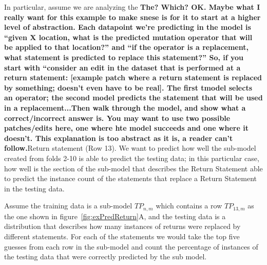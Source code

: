 \documentclass[conference]{IEEEtran}
\newcommand{\todo}[1]
  {{\scriptsize \textbf{\color{red} {#1}}}}
\begin{document}
In 
particular, assume we are analyzing the\todo{The? Which?  OK.  Maybe what I
  really want for this example to make snese is for it to start at a higher
  level of abstraction.  Each datapoint we're predicting in the model is ``given
  X location, what is the predicted mutation operator that will be applied to
  that location?''  and ``if the operator is a replacement, what statement is
  predicted to replace this statement?''  So, if you start with ``consider an
  edit in the dataset that is performed at a return statement: [example patch
  where a return statement is replaced by something; doesn't even have to be
  real].  The first tmodel selects an operator; the second model predicts the
  statement that will be used in a replacement...Then walk through the model,
  and show what a correct/incorrect answer is.  You may want to use two possible
  patches/edits here, one where hte model succeeds and one where it doesn't.
  This explanation is too abstract as it is, a reader can't follow.}Return statement (Row 13). We want to 
predict 
how well the sub-model created from folds 2-10 is able to predict the testing 
data; in this particular case, how well is the section of the sub-model that 
describes the Return Statement able to predict the instance count of the 
statements that replace a Return Statement in the testing data.

Assume the training data is a sub-model $TP_{n,m}$ which contains a row 
$TP_{13,m}$ as the one shown in figure~\ref{fig:exPredReturn}A, and the testing data is a distribution that describes 
how many instances of returns were replaced by different statements.
For each of the statements we would take the top five guesses from each row in 
the sub-model and count the percentage of instances of the testing data that were correctly 
predicted by the sub model. 
\end{document}
